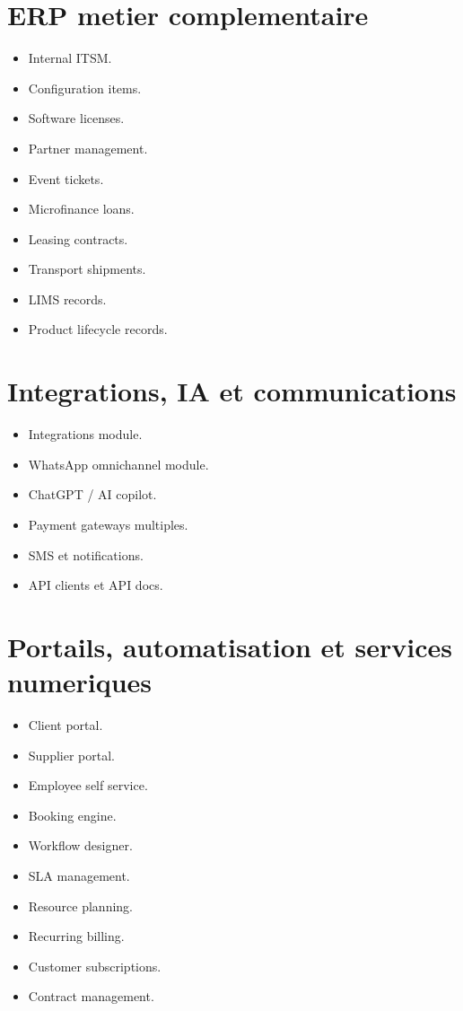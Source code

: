 \documentclass[11pt,a4paper]{article}
\begin{document}
\section{ERP metier complementaire}
\begin{itemize}[leftmargin=1.2cm]
    \item Internal ITSM.
    \item Configuration items.
    \item Software licenses.
    \item Partner management.
    \item Event tickets.
    \item Microfinance loans.
    \item Leasing contracts.
    \item Transport shipments.
    \item LIMS records.
    \item Product lifecycle records.
\end{itemize}

\section{Integrations, IA et communications}
\begin{itemize}[leftmargin=1.2cm]
    \item Integrations module.
    \item WhatsApp omnichannel module.
    \item ChatGPT / AI copilot.
    \item Payment gateways multiples.
    \item SMS et notifications.
    \item API clients et API docs.
\end{itemize}

\section{Portails, automatisation et services numeriques}
\begin{itemize}[leftmargin=1.2cm]
    \item Client portal.
    \item Supplier portal.
    \item Employee self service.
    \item Booking engine.
    \item Workflow designer.
    \item SLA management.
    \item Resource planning.
    \item Recurring billing.
    \item Customer subscriptions.
    \item Contract management.
\end{itemize}
\end{document}
